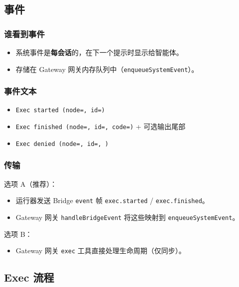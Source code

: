 \subsection{事件}


\subsubsection{谁看到事件}


\begin{itemize}
  \item 系统事件是\textbf{每会话}的，在下一个提示时显示给智能体。
  \item 存储在 Gateway 网关内存队列中（\texttt{enqueueSystemEvent}）。
\end{itemize}


\subsubsection{事件文本}


\begin{itemize}
  \item \texttt{Exec started (node=, id=)}
  \item \texttt{Exec finished (node=, id=, code=)} + 可选输出尾部
  \item \texttt{Exec denied (node=, id=, )}
\end{itemize}


\subsubsection{传输}


选项 A（推荐）：

\begin{itemize}
  \item 运行器发送 Bridge \texttt{event} 帧 \texttt{exec.started} / \texttt{exec.finished}。
  \item Gateway 网关 \texttt{handleBridgeEvent} 将这些映射到 \texttt{enqueueSystemEvent}。
\end{itemize}


选项 B：

\begin{itemize}
  \item Gateway 网关 \texttt{exec} 工具直接处理生命周期（仅同步）。
\end{itemize}


\subsection{Exec 流程}


